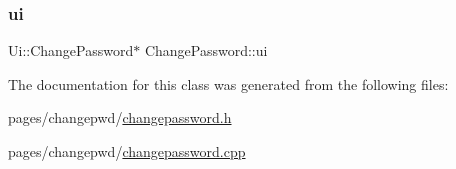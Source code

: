 \subsubsection{\texorpdfstring{ui}{ui}}
{\footnotesize\ttfamily Ui\+::\+Change\+Password$\ast$ Change\+Password\+::ui\hspace{0.3cm}{\ttfamily [private]}}



The documentation for this class was generated from the following files\+:\begin{DoxyCompactItemize}
\item 
pages/changepwd/\mbox{\hyperlink{changepassword_8h}{changepassword.\+h}}\item 
pages/changepwd/\mbox{\hyperlink{changepassword_8cpp}{changepassword.\+cpp}}\end{DoxyCompactItemize}
